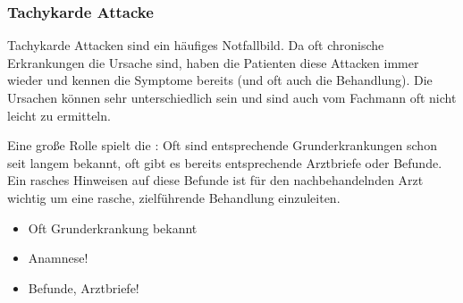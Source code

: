 

\subsubsection{Tachykarde Attacke}
\label{topic:tachykarde-attacke}



{%
Tachykarde Attacken sind ein häufiges Notfallbild. Da oft
chronische Erkrankungen die Ursache sind, haben die
Patienten diese Attacken immer wieder und kennen die
Symptome bereits (und oft auch die Behandlung). Die Ursachen
können sehr unterschiedlich sein und sind auch vom Fachmann
oft nicht leicht zu ermitteln.

Eine große Rolle spielt die : Oft sind
entsprechende Grunderkrankungen schon seit langem bekannt,
oft gibt es bereits entsprechende Arztbriefe oder Befunde.
Ein rasches Hinweisen auf diese Befunde ist für den
nachbehandelnden Arzt wichtig um eine rasche, zielführende
Behandlung einzuleiten.
}{
\begin{itemize}
  \item Oft Grunderkrankung bekannt
  \item Anamnese!
  \item Befunde, Arztbriefe!
\end{itemize}
}{}{}{}

